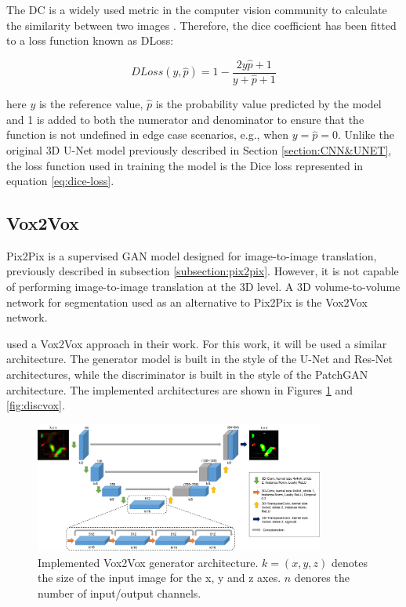 The \ac{DC} is a widely used metric in the computer vision community to calculate the similarity between two images \cite{diceloss}. Therefore, the dice coefficient has been fitted to a loss function known as \ac{DLoss}:

\begin{equation}
    DLoss(y,\hat{p}) = 1 - \frac{2y\hat{p}+1}{y+\hat{p}+1}
    \label{eq:dice-loss}
\end{equation}

\noindent here $y$ is the reference value, $\hat{p}$ is the probability value predicted by the model and 1 is added to both the numerator and denominator to ensure that the function is not undefined in edge case scenarios, e.g., when $y=\hat{p}=0$. Unlike the original \ac{3D} U-Net model \cite{Unet:3D} previously described in Section \ref{section:CNN&UNET}, the loss function used in training the model is the Dice loss represented in equation \ref{eq:dice-loss}.

\subsection{Vox2Vox}

Pix2Pix is a supervised \ac{GAN} model designed for image-to-image translation, previously described in subsection \ref{subsection:pix2pix}. However, it is not capable of performing image-to-image translation at the \ac{3D} level. A \ac{3D} volume-to-volume network for segmentation used as an alternative to Pix2Pix is the Vox2Vox network.

\citet{vox2vox} used a Vox2Vox approach in their work. For this work, it will be used a similar architecture. The generator model is built in the style of the U-Net and Res-Net \cite{2015deep} architectures, while the discriminator is built in the style of the PatchGAN \cite{isola2018imagetoimage}  architecture. The implemented architectures are shown in Figures \ref{fig:genvox} and \ref{fig:discvox}.

\begin{figure}[!htb]
  \centering
  \includegraphics[width=0.85\textwidth]{Images/Picture2.jpg}
  \caption{Implemented Vox2Vox generator architecture. $k=(x,y,z)$ denotes the size of the input image for the x, y and z axes. $n$ denores the number of input/output channels.}
  \label{fig:genvox}
\end{figure}

